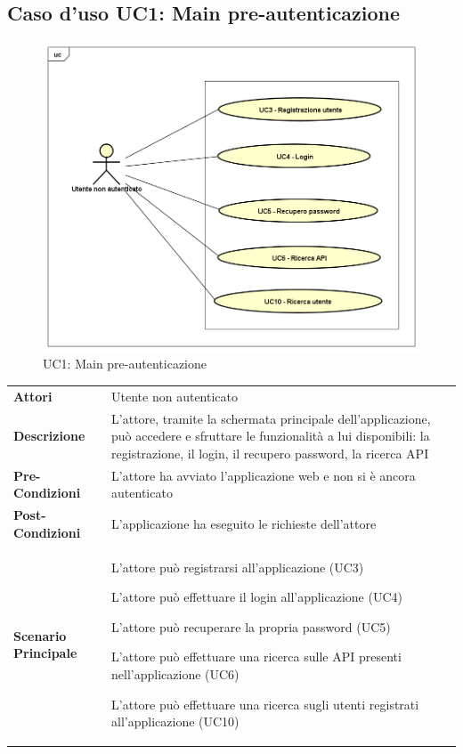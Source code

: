 \newpage
\subsection{Caso d'uso UC1: Main pre-autenticazione }
\label{UC1}
\begin{figure}[ht]
	\centering
	\includegraphics[scale=0.45]{UML/UC1.png}
	\caption{UC1: Main pre-autenticazione}
\end{figure}

\renewcommand*{\arraystretch}{1.6}
\begin{longtable}{ l | p{11cm}}
	\hline
	\rowcolor{Gray}
	 \multicolumn{2}{c}{UC1 - Main pre-autenticazione} \\
	 \hline
	\textbf{Attori} & Utente non autenticato  \\
	\textbf{Descrizione} & L'attore, tramite la schermata principale dell'applicazione, può accedere e sfruttare le funzionalità a lui disponibili: la registrazione, il login, il recupero password, la ricerca API  \\
	\textbf{Pre-Condizioni} & L'attore ha avviato l'applicazione web e non si è ancora autenticato \\
	\textbf{Post-Condizioni} & L'applicazione ha eseguito le richieste dell'attore\\
	\textbf{Scenario Principale} & \begin{enumerate*}[label=(\arabic*.),itemjoin={\newline}]
		\item L'attore può registrarsi all'applicazione (UC3)
		\item L'attore può effettuare il login all'applicazione (UC4)
		\item L'attore può recuperare la propria password (UC5)
		\item L'attore può effettuare una ricerca sulle API presenti nell'applicazione (UC6)
		\item L'attore può effettuare una ricerca sugli utenti registrati all'applicazione (UC10)
	\end{enumerate*}\\
\end{longtable}